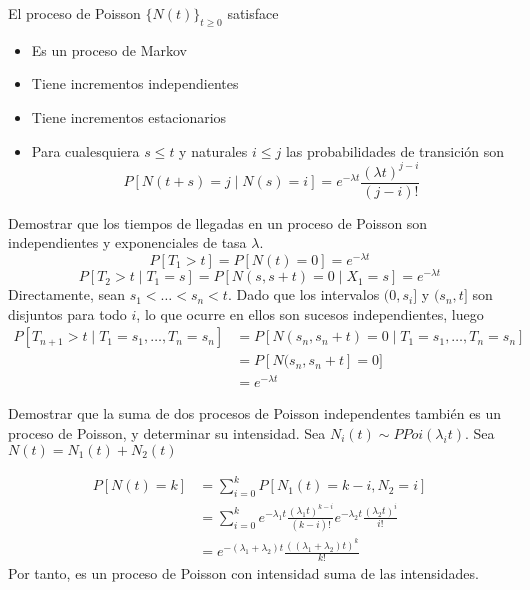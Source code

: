 \documentclass[PREyA.tex]{subfiles}
\begin{document}
\begin{prop}
El proceso de Poisson $\{N(t)\}_{t\geq 0}$ satisface
\begin{itemize}
\item Es un proceso de Markov
\item Tiene incrementos independientes
\item Tiene incrementos estacionarios
\item Para cualesquiera $s\leq t$ y naturales $i\leq j$ las probabilidades de transición son
$$
P[N(t+s)=j\mid N(s)=i] = e^{-\lambda t}\frac{(\lambda t)^{j-i}}{(j-i)!}
$$
\end{itemize}
\end{prop}
\begin{example}
Demostrar que los tiempos de llegadas en un proceso de Poisson son independientes y exponenciales de tasa $\lambda$. 
$$
P[T_1 > t] =  P[N(t) = 0] = e^{-\lambda t}
$$
$$
P[T_2 > t\mid T_1 = s] =  P[N(s,s+t) = 0\mid X_1 = s] = e^{-\lambda t}
$$
Directamente, sean $s_1<\dotsc<s_n<t$. Dado que los intervalos $(0,s_i]$ y $(s_n,t]$ son disjuntos para todo $i$, lo que ocurre en ellos son sucesos independientes, luego
\begin{align*}
P[T_{n+1} > t \mid T_1 = s_1,\dotsc, T_n = s_n] &= P[N(s_n,s_n+t)=0 \mid T_1 = s_1,\dotsc, T_n = s_n]\\
& = P[N(s_n,s_n+t] = 0]\\
&= e^{-\lambda t}
\end{align*}
\end{example}
\begin{example}
Demostrar que la suma de dos procesos de Poisson independentes también es un proceso de Poisson, y determinar su intensidad. Sea $N_i(t)\sim PPoi(\lambda_i t)$. Sea $N(t)=N_1(t)+N_2(t)$

\begin{align*}
P[N(t)= k] &= \sum_{i=0}^k P[N_1(t)=k-i,N_2=i] \\
&= \sum_{i=0}^k e^{-\lambda_1 t}\frac{(\lambda_1 t)^{k-i}}{(k-i)!}e^{-\lambda_2 t}\frac{(\lambda_2 t)^{i}}{i!}\\
&= e^{-(\lambda_1+\lambda_2)t}\frac{((\lambda_1+\lambda_2)t)^k}{k!}
\end{align*}
Por tanto, es un proceso de Poisson con intensidad suma de las intensidades.
\end{example}
\end{document}
